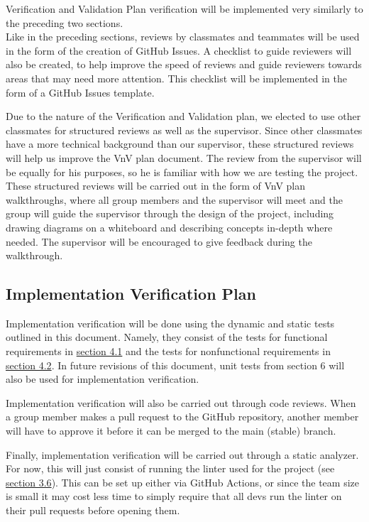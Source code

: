\documentclass[12pt, titlepage]{article}
\begin{document}
Verification and Validation Plan verification will be implemented very similarly to the preceding two sections. \\
Like in the preceding sections, reviews by classmates and teammates will be used in the form of the creation of GitHub Issues. A checklist to guide reviewers will also be created, to help improve the speed of reviews and guide reviewers towards areas that may need more attention. This checklist will be implemented in the form of a GitHub Issues template.

Due to the nature of the Verification and Validation plan, we elected to use other classmates for structured reviews as well as the supervisor. Since other classmates have a more technical background than our supervisor, these structured reviews will help us improve the VnV plan document. The review from the supervisor will be equally for his purposes, so he is familiar with how we are testing the project. These structured reviews will be carried out in the form of VnV plan walkthroughs, where all group members and the supervisor will meet and the group will guide the supervisor through the design of the project, including drawing diagrams on a whiteboard and describing concepts in-depth where needed. The supervisor will be encouraged to give feedback during the walkthrough.

\subsection{Implementation Verification Plan}

  Implementation verification will be done using the dynamic and static tests outlined in this document. Namely, they consist of the tests for functional requirements in \hyperref[s5.1]{section 4.1} and the tests for nonfunctional requirements in \hyperref[s5.2]{section 4.2}. In future revisions of this document, unit tests from section 6 will also be used for implementation verification.
  
  Implementation verification will also be carried out through code reviews. When a group member makes a pull request to the GitHub repository, another member will have to approve it before it can be merged to the main (stable) branch.
  
  Finally, implementation verification will be carried out through a static analyzer. For now, this will just consist of running the linter used for the project (see \hyperref[s4.6]{section 3.6}). This can be set up either via GitHub Actions, or since the team size is small it may cost less time to simply require that all devs run the linter on their pull requests before opening them.
\end{document}
